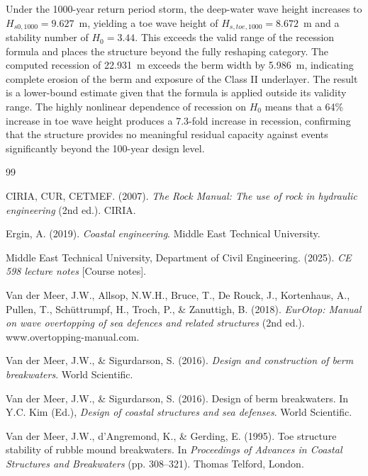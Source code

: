\documentclass[a4paper, 11pt]{article}
\begin{document}
Under the 1000-year return period storm, the deep-water wave height increases to $H_{s0,1000} = 9.627$~m, yielding a toe wave height of $H_{s,toe,1000} = 8.672$~m and a stability number of $H_0 = 3.44$. This exceeds the valid range of the recession formula and places the structure beyond the fully reshaping category. The computed recession of 22.931~m exceeds the berm width by 5.986~m, indicating complete erosion of the berm and exposure of the Class II underlayer. The result is a lower-bound estimate given that the formula is applied outside its validity range. The highly nonlinear dependence of recession on $H_0$ means that a 64\% increase in toe wave height produces a 7.3-fold increase in recession, confirming that the structure provides no meaningful residual capacity against events significantly beyond the 100-year design level.

\newpage


\begin{thebibliography}{99}

CIRIA, CUR, CETMEF. (2007). \textit{The Rock Manual: The use of rock in hydraulic engineering} (2nd ed.). CIRIA.

Ergin, A. (2019). \textit{Coastal engineering}. Middle East Technical University.

Middle East Technical University, Department of Civil Engineering. (2025). \textit{CE 598 lecture notes} [Course notes].

Van der Meer, J.W., Allsop, N.W.H., Bruce, T., De Rouck, J., Kortenhaus, A., Pullen, T., Sch\"{u}ttrumpf, H., Troch, P., \& Zanuttigh, B. (2018). \textit{EurOtop: Manual on wave overtopping of sea defences and related structures} (2nd ed.). www.overtopping-manual.com.

Van der Meer, J.W., \& Sigurdarson, S. (2016). \textit{Design and construction of berm breakwaters}. World Scientific.

Van der Meer, J.W., \& Sigurdarson, S. (2016). Design of berm breakwaters. In Y.C. Kim (Ed.), \textit{Design of coastal structures and sea defenses}. World Scientific.

Van der Meer, J.W., d'Angremond, K., \& Gerding, E. (1995). Toe structure stability of rubble mound breakwaters. In \textit{Proceedings of Advances in Coastal Structures and Breakwaters} (pp. 308--321). Thomas Telford, London.

\end{thebibliography}
\newpage
\end{document}
